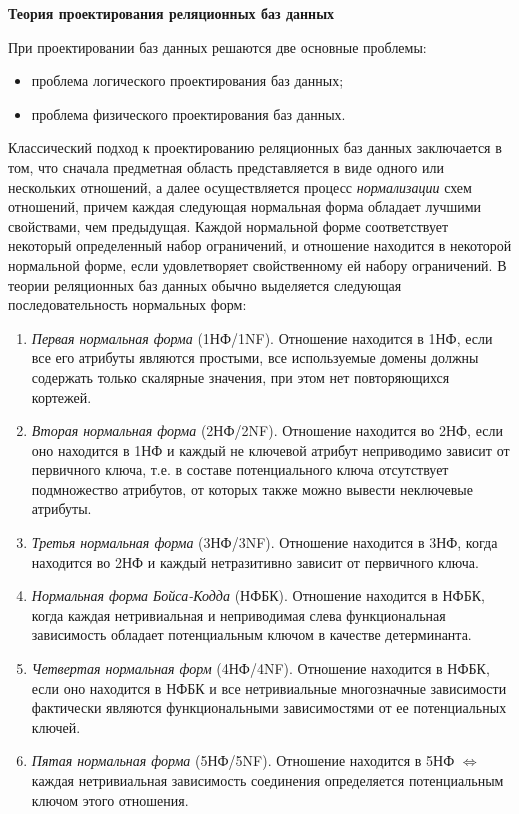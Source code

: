\textbf{Теория проектирования реляционных баз данных}

При проектировании баз данных решаются две основные проблемы:
\begin{itemize}
	\item проблема логического проектирования баз данных;
	\item проблема физического проектирования баз данных.
\end{itemize}

Классический подход к проектированию реляционных баз данных заключается в том, что сначала предметная область представляется в виде одного или нескольких отношений, а далее осуществляется процесс \textit{нормализации} схем отношений, причем каждая следующая нормальная форма обладает лучшими свойствами, чем предыдущая.
Каждой нормальной форме соответствует некоторый определенный набор ограничений, и отношение находится в некоторой нормальной форме, если удовлетворяет свойственному ей набору ограничений.
В теории реляционных баз данных обычно выделяется следующая последовательность нормальных форм:
\begin{enumerate}
	\item \textit{Первая нормальная форма} (1НФ/1NF).
	Отношение находится в 1НФ, если все его атрибуты являются простыми, все используемые домены должны содержать только скалярные значения, при этом нет повторяющихся кортежей.
	\item \textit{Вторая нормальная форма} (2НФ/2NF).
	Отношение находится во 2НФ, если оно находится в 1НФ и каждый не ключевой атрибут неприводимо зависит от первичного ключа, т.е. в составе потенциального ключа отсутствует подмножество атрибутов, от которых также можно вывести неключевые атрибуты.
	\item \textit{Третья нормальная форма} (3НФ/3NF).
	Отношение находится в 3НФ, когда находится во 2НФ и каждый нетразитивно зависит от первичного ключа.
	\item \textit{Нормальная форма Бойса-Кодда} (НФБК).
	Отношение находится в НФБК, когда каждая нетривиальная и неприводимая слева функциональная зависимость обладает потенциальным ключом в качестве детерминанта.
	\item \textit{Четвертая нормальная форм} (4НФ/4NF).
	Отношение находится в НФБК, если оно находится в НФБК и все нетривиальные многозначные зависимости фактически являются функциональными зависимостями от ее потенциальных ключей.
	\item \textit{Пятая нормальная форма} (5НФ/5NF).
	Отношение находится в 5НФ $\Leftrightarrow$ каждая нетривиальная зависимость соединения определяется потенциальным ключом этого отношения.
\end{enumerate}

